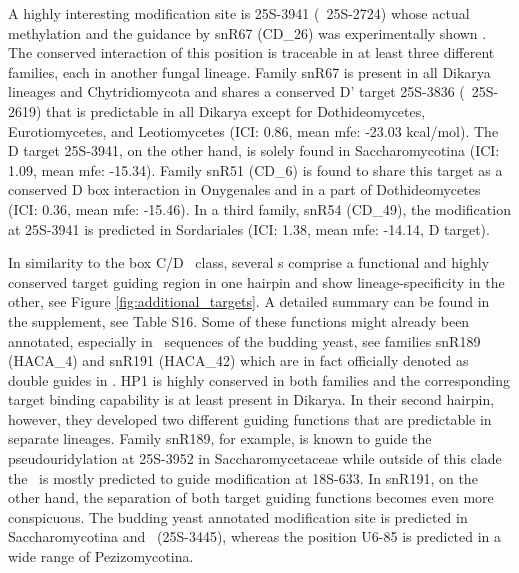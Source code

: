 A highly interesting modification site is 25S-3941 (\sce\ 25S-2724)
whose actual methylation and the guidance by snR67 (CD\_26) was
experimentally shown \cite{Lowe:1999}. The conserved interaction of
this position is traceable in at least three different families, each
in another fungal lineage. Family snR67 is present in all Dikarya
lineages and Chytridiomycota and shares a conserved D' target 25S-3836
(\sce\ 25S-2619) that is predictable in all Dikarya except for
Dothideomycetes, Eurotiomycetes, and Leotiomycetes (ICI: 0.86, mean
mfe: -23.03 kcal/mol). The D target 25S-3941, on the other hand, is
solely found in Saccharomycotina (ICI: 1.09, mean mfe: -15.34). Family
snR51 (CD\_6) is found to share this target as a conserved D box
interaction in Onygenales and in a part of Dothideomycetes (ICI: 0.36,
mean mfe: -15.46). In a third family, snR54 (CD\_49), the modification
at 25S-3941 is predicted in Sordariales (ICI: 1.38, mean mfe: -14.14,
D target).

In similarity to the box C/D \sno\ class, several \haca s comprise a
functional and highly conserved target guiding region in one hairpin
and show lineage-specificity in the other, see Figure
\ref{fig:additional_targets}.  A detailed summary can be found in the
supplement, see Table S16. Some of these functions might already been
annotated, especially in \sno\ sequences of the budding yeast, see
families snR189 (HACA\_4) and snR191 (HACA\_42) which are in fact
officially denoted as double guides in \sce.  HP1 is highly conserved
in both families and the corresponding target binding capability is at
least present in Dikarya. In their second hairpin, however, they
developed two different guiding functions that are predictable in
separate lineages. Family snR189, for example, is known to guide the
pseudouridylation at 25S-3952 in Saccharomycetaceae while outside of
this clade the \sno\ is mostly predicted to guide modification at
18S-633. In snR191, on the other hand, the separation of both target
guiding functions becomes even more conspicuous. The budding yeast
annotated modification site is predicted in Saccharomycotina and \Tde\
(25S-3445), whereas the position U6-85 is predicted in a wide range of
Pezizomycotina.

